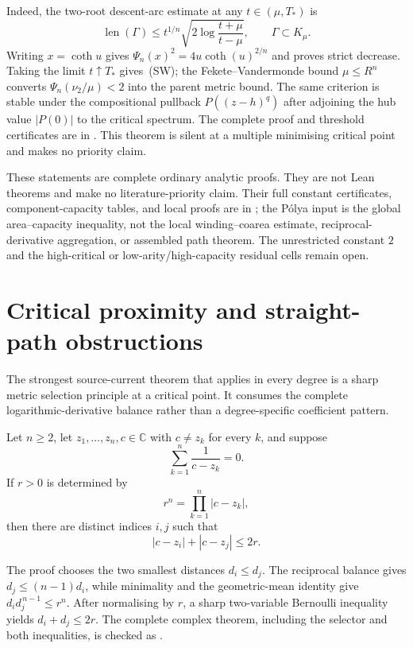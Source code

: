 \documentclass[11pt]{article}
\newcommand{\pdecl}[1]{\emph{\leanlabel{#1}}}
\begin{document}
Indeed, the two-root descent-arc estimate at any $t\in(\mu,T_*)$ is
\[
 \operatorname{len}(\Gamma)
 \le t^{1/n}\sqrt{2\log\frac{t+\mu}{t-\mu}},
 \qquad \Gamma\subset K_\mu.
\]
Writing $x=\coth u$ gives
$\Psi_n(x)^2=4u\coth(u)^{2/n}$ and proves strict decrease.  Taking the limit
$t\uparrow T_*$ gives~(SW); the Fekete--Vandermonde bound
$\mu\le R^n$ converts $\Psi_n(\nu_2/\mu)<2$ into the parent metric bound.
The same criterion is stable under the compositional pullback
$P((z-h)^q)$ after adjoining the hub value $|P(0)|$ to the critical spectrum.
The complete proof and threshold certificates are in
.  This theorem is
silent at a multiple minimising critical point and makes no priority claim.

These statements are complete ordinary analytic proofs.  They are not Lean
theorems and make no literature-priority claim.  Their full constant
certificates, component-capacity tables, and local proofs are in
; the
P\'olya input is the global area--capacity inequality, not the local
winding--coarea estimate, reciprocal-derivative aggregation, or assembled
path theorem.  The unrestricted constant $2$ and the high-critical or
low-arity/high-capacity residual cells remain open.

\section{Critical proximity and straight-path obstructions}
\label{sec:critical-proximity}

The strongest source-current theorem that applies in every degree is a sharp
metric selection principle at a critical point.  It consumes the complete
logarithmic-derivative balance rather than a degree-specific coefficient
pattern.

\begin{theorem}
\label{res:critical-proximity}
Let $n\ge2$, let $z_1,\ldots,z_n,c\in\mathbb C$ with $c\ne z_k$ for every
$k$, and suppose
\[
  \sum_{k=1}^n\frac1{c-z_k}=0.
\]
If $r>0$ is determined by
\[
  r^n=\prod_{k=1}^n|c-z_k|,
\]
then there are distinct indices $i,j$ such that
\[
  |c-z_i|+|c-z_j|\le2r.
\]
\end{theorem}

\noindent The proof chooses the two smallest distances $d_i\le d_j$.
The reciprocal balance gives $d_j\le(n-1)d_i$, while minimality and the
geometric-mean identity give
$d_i d_j^{\,n-1}\le r^n$.  After normalising by $r$, a sharp two-variable
Bernoulli inequality yields $d_i+d_j\le2r$.  The complete complex theorem,
including the selector and both inequalities, is checked as
\pdecl{exists_two_roots_dist_sum_le_two_mul_geomMean}.
\end{document}
